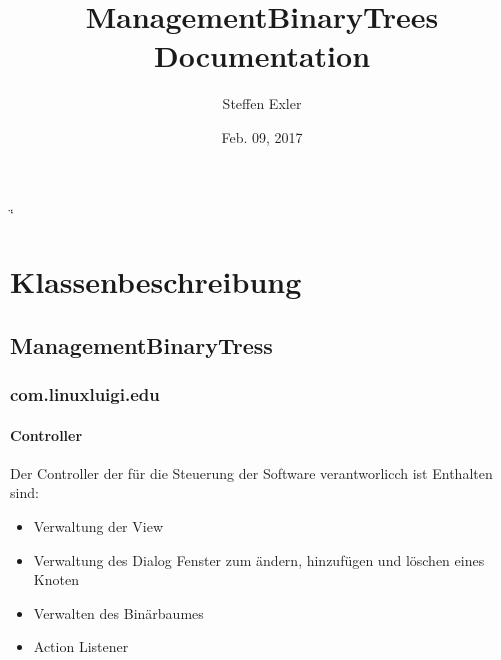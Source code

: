 \documentclass[letterpaper,10pt,ngerman]{sphinxmanual}
\title{ManagementBinaryTrees Documentation}
\date{Feb. 09, 2017}
\author{Steffen Exler}
\begin{document}
\if\catcode`\"\active{}\fi
\maketitle
\sphinxtableofcontents
{}\label{\detokenize{index::doc}}



\chapter{Klassenbeschreibung}
\label{\detokenize{index:welcome-to-managementbinarytrees-s-documentation}}\label{\detokenize{index:klassenbeschreibung}}

\section{ManagementBinaryTress}
\label{\detokenize{packages::doc}}\label{\detokenize{packages:managementbinarytress}}

\subsection{com.linuxluigi.edu}
\label{\detokenize{com/linuxluigi/edu/package-index::doc}}\label{\detokenize{com/linuxluigi/edu/package-index:package-com.linuxluigi.edu}}\label{\detokenize{com/linuxluigi/edu/package-index:com-linuxluigi-edu}}

\subsubsection{Controller}
\label{\detokenize{com/linuxluigi/edu/Controller::doc}}\label{\detokenize{com/linuxluigi/edu/Controller:controller}}

\begin{fulllineitems}
\label{\detokenize{com/linuxluigi/edu/Controller:com.linuxluigi.edu.Controller}}
Der Controller der für die Steuerung der Software verantworlicch ist Enthalten sind:
\begin{itemize}
\item {} 
Verwaltung der View

\item {} 
Verwaltung des Dialog Fenster zum ändern, hinzufügen und löschen eines Knoten

\item {} 
Verwalten des Binärbaumes

\item {} 
Action Listener

\end{itemize}

\end{fulllineitems}
\end{document}
